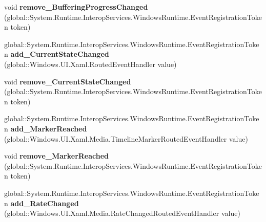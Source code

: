 \begin{DoxyCompactItemize}
void {\bfseries remove\+\_\+\+Buffering\+Progress\+Changed} (global\+::\+System.\+Runtime.\+Interop\+Services.\+Windows\+Runtime.\+Event\+Registration\+Token token)
\item 
\mbox{\label{class_windows_1_1_u_i_1_1_xaml_1_1_controls_1_1_media_element_ae6fc988c596577fb1e064d953f8d6bdf}} 
global\+::\+System.\+Runtime.\+Interop\+Services.\+Windows\+Runtime.\+Event\+Registration\+Token {\bfseries add\+\_\+\+Current\+State\+Changed} (global\+::\+Windows.\+U\+I.\+Xaml.\+Routed\+Event\+Handler value)
\item 
\mbox{\label{class_windows_1_1_u_i_1_1_xaml_1_1_controls_1_1_media_element_aebdc30f4274c70b12f3c5f0fb3aaf725}} 
void {\bfseries remove\+\_\+\+Current\+State\+Changed} (global\+::\+System.\+Runtime.\+Interop\+Services.\+Windows\+Runtime.\+Event\+Registration\+Token token)
\item 
\mbox{\label{class_windows_1_1_u_i_1_1_xaml_1_1_controls_1_1_media_element_a6083c0220c513d85efe6176f20144ebf}} 
global\+::\+System.\+Runtime.\+Interop\+Services.\+Windows\+Runtime.\+Event\+Registration\+Token {\bfseries add\+\_\+\+Marker\+Reached} (global\+::\+Windows.\+U\+I.\+Xaml.\+Media.\+Timeline\+Marker\+Routed\+Event\+Handler value)
\item 
\mbox{\label{class_windows_1_1_u_i_1_1_xaml_1_1_controls_1_1_media_element_a0808fb3f0499ca8aec86e05b44b1379c}} 
void {\bfseries remove\+\_\+\+Marker\+Reached} (global\+::\+System.\+Runtime.\+Interop\+Services.\+Windows\+Runtime.\+Event\+Registration\+Token token)
\item 
\mbox{\label{class_windows_1_1_u_i_1_1_xaml_1_1_controls_1_1_media_element_ad94df9e8fcffeae53d73f460020d8cf9}} 
global\+::\+System.\+Runtime.\+Interop\+Services.\+Windows\+Runtime.\+Event\+Registration\+Token {\bfseries add\+\_\+\+Rate\+Changed} (global\+::\+Windows.\+U\+I.\+Xaml.\+Media.\+Rate\+Changed\+Routed\+Event\+Handler value)
\item 
\mbox{\label{class_windows_1_1_u_i_1_1_xaml_1_1_controls_1_1_media_element_a73c0ccdb24c5c0626b36b25df7adc1fc}} 

\end{DoxyCompactItemize}
